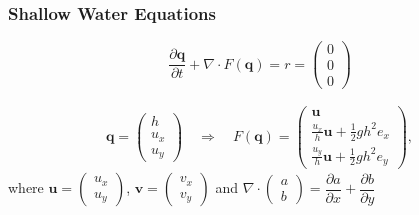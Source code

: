 \documentclass{beamer}
\newcommand{\pd}[2]{\dfrac{\partial #1}{\partial #2}}
\begin{document}
\begin{frame}
  \frametitle{Shallow Water Equations}
  \begin{equation}
    \label{eq:shallow-water-basic}
    \pd{\mathbf{q}}{t} + \nabla \cdot F(\mathbf{q}) = r = \begin{pmatrix}
      0 \\ 0\\ 0
    \end{pmatrix}
  \end{equation}

%
  \begin{eqnarray*}
    \mathbf{q} =
    \begin{pmatrix}
      h \\ u_x \\ u_y
    \end{pmatrix} \quad \Rightarrow \quad F(\mathbf{q}) =
    \begin{pmatrix}
      \mathbf{u} \\ \frac{u_x}{h} \mathbf{u} + \frac{1}{2} g h^2 e_x \\ \frac{u_y}{h} \mathbf{u}+
      \frac{1}{2} g h^2 e_y
    \end{pmatrix},
  \end{eqnarray*}
  where $\mathbf{u}=
  \begin{pmatrix}
    u_x \\ u_y
  \end{pmatrix}$, $\mathbf{v} =
  \begin{pmatrix}
    v_x \\ v_y
  \end{pmatrix}$ and $\nabla \cdot
  \begin{pmatrix}
    a \\ b
  \end{pmatrix} = \pd{a}{x} + \pd{b}{y}$
\end{frame}
\end{document}
